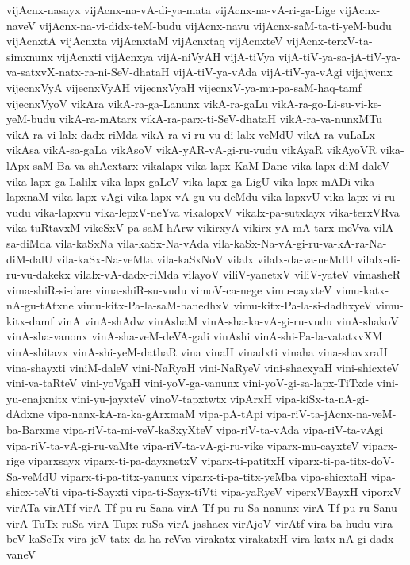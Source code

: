 {vijAcnx-nasayx
vijAcnx-na-vA-di-ya-mata
vijAcnx-na-vA-ri-ga-Lige
vijAcnx-naveV
vijAcnx-na-vi-didx-teM-budu
vijAcnx-navu
vijAcnx-saM-ta-ti-yeM-budu
vijAcnxtA
vijAcnxta
vijAcnxtaM
vijAcnxtaq
vijAcnxteV
vijAcnx-terxV-ta-simxnunx
vijAcnxti
vijAcnxya
vijA-niVyAH
vijA-tiVya
vijA-tiV-ya-sa-jA-tiV-ya-va-satxvX-natx-ra-ni-SeV-dhataH
vijA-tiV-ya-vAda
vijA-tiV-ya-vAgi
vijajwcnx
vijecnxVyA
vijecnxVyAH
vijecnxVyaH
vijecnxV-ya-mu-pa-saM-haq-tamf
vijecnxVyoV
vikAra
vikA-ra-ga-Lanunx
vikA-ra-gaLu
vikA-ra-go-Li-su-vi-ke-yeM-budu
vikA-ra-mAtarx
vikA-ra-parx-ti-SeV-dhataH
vikA-ra-va-nunxMTu
vikA-ra-vi-lalx-dadx-riMda
vikA-ra-vi-ru-vu-di-lalx-veMdU
vikA-ra-vuLaLx
vikAsa
vikA-sa-gaLa
vikAsoV
vikA-yAR-vA-gi-ru-vudu
vikAyaR
vikAyoVR
vika-lApx-saM-Ba-va-shAcxtarx
vikalapx
vika-lapx-KaM-Dane
vika-lapx-diM-daleV
vika-lapx-ga-Lalilx
vika-lapx-gaLeV
vika-lapx-ga-LigU
vika-lapx-mADi
vika-lapxnaM
vika-lapx-vAgi
vika-lapx-vA-gu-vu-deMdu
vika-lapxvU
vika-lapx-vi-ru-vudu
vika-lapxvu
vika-lepxV-neYva
vikalopxV
vikalx-pa-sutxlayx
vika-terxVRva
vika-tuRtavxM
vikeSxV-pa-saM-hArw
vikirxyA
vikirx-yA-mA-tarx-meVva
vilA-sa-diMda
vila-kaSxNa
vila-kaSx-Na-vAda
vila-kaSx-Na-vA-gi-ru-va-kA-ra-Na-diM-dalU
vila-kaSx-Na-veMta
vila-kaSxNoV
vilalx
vilalx-da-va-neMdU
vilalx-di-ru-vu-dakekx
vilalx-vA-dadx-riMda
vilayoV
viliV-yanetxV
viliV-yateV
vimasheR
vima-shiR-si-dare
vima-shiR-su-vudu
vimoV-ca-nege
vimu-cayxteV
vimu-katx-nA-gu-tAtxne
vimu-kitx-Pa-la-saM-banedhxV
vimu-kitx-Pa-la-si-dadhxyeV
vimu-kitx-damf
vinA
vinA-shAdw
vinAshaM
vinA-sha-ka-vA-gi-ru-vudu
vinA-shakoV
vinA-sha-vanonx
vinA-sha-veM-deVA-gali
vinAshi
vinA-shi-Pa-la-vatatxvXM
vinA-shitavx
vinA-shi-yeM-dathaR
vina
vinaH
vinadxti
vinaha
vina-shavxraH
vina-shayxti
viniM-daleV
vini-NaRyaH
vini-NaRyeV
vini-shacxyaH
vini-shicxteV
vini-va-taRteV
vini-yoVgaH
vini-yoV-ga-vanunx
vini-yoV-gi-sa-lapx-TiTxde
vini-yu-cnajxnitx
vini-yu-jayxteV
vinoV-tapxtwtx
vipArxH
vipa-kiSx-ta-nA-gi-dAdxne
vipa-nanx-kA-ra-ka-gArxmaM
vipa-pA-tApi
vipa-riV-ta-jAcnx-na-veM-ba-Barxme
vipa-riV-ta-mi-veV-kaSxyXteV
vipa-riV-ta-vAda
vipa-riV-ta-vAgi
vipa-riV-ta-vA-gi-ru-vaMte
vipa-riV-ta-vA-gi-ru-vike
viparx-mu-cayxteV
viparx-rige
viparxsayx
viparx-ti-pa-dayxnetxV
viparx-ti-patitxH
viparx-ti-pa-titx-doV-Sa-veMdU
viparx-ti-pa-titx-yanunx
viparx-ti-pa-titx-yeMba
vipa-shicxtaH
vipa-shicx-teVti
vipa-ti-Sayxti
vipa-ti-Sayx-tiVti
vipa-yaRyeV
viperxVBayxH
viporxV
virATa
virATf
virA-Tf-pu-ru-Sana
virA-Tf-pu-ru-Sa-nanunx
virA-Tf-pu-ru-Sanu
virA-TuTx-ruSa
virA-Tupx-ruSa
virA-jashacx
virAjoV
virAtf
vira-ba-hudu
vira-beV-kaSeTx
vira-jeV-tatx-da-ha-reVva
virakatx
virakatxH
vira-katx-nA-gi-dadx-vaneV
}
